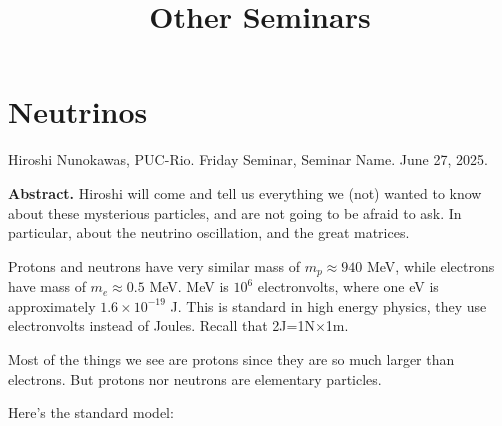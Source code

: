 







\title{Other Seminars}

\maketitle




\label{section-phantom}



\tableofcontents



\section{Neutrinos}
\label{section-neutrinos}

\noindent
Hiroshi Nunokawas, PUC-Rio.
Friday Seminar, Seminar Name.
June 27, 2025.

\medskip\noindent
{\bf Abstract.} Hiroshi will come and tell us
everything we (not) wanted to know
about these mysterious particles, and are not
going to be afraid to ask. In
particular, about the neutrino oscillation,
and the great matrices.

\bigskip\noindent

Protons and neutrons have very similar mass
of $m_p\approx 940$ MeV, while
electrons have mass of $m_e \approx 0.5$ MeV.
MeV is $10^{6}$ electronvolts,
where one eV is approximately $1.6\times
10^{-19}$ J. This is standard in high
energy physics, they use electronvolts
instead of Joules. Recall that
2J=1N$\times$1m.

Most of the things we see are protons since
they are so much larger than
electrons. But protons nor neutrons are
elementary particles.

Here's the standard model:

\medskip

